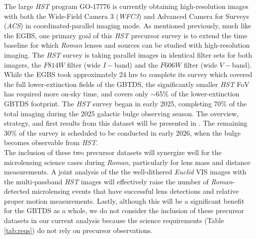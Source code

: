 \documentclass[twocolumn]{aastex631}
\begin{document}
\indent The large \textit{HST} program GO-17776 \citep{terry:2025b} is currently obtaining high-resolution images with both the Wide-Field Camera 3 (\textit{WFC3}) and Advanced Camera for Surveys (\textit{ACS}) in coordinated-parallel imaging mode. As mentioned previously, much like the EGBS, one primary goal of this \textit{HST} precursor survey is to extend the time baseline for which \textit{Roman} lenses and sources can be studied with high-resolution imaging. The \textit{HST} survey is taking parallel images in identical filter sets for both imagers, the $F814W$ filter (wide $I-$band) and the $F606W$ filter (wide $V-$band). While the EGBS took approximately 24 hrs to complete its survey which covered the full lower-extinction fields of the GBTDS, the significantly smaller \textit{HST} FoV has required more on-sky time, and covers only ${\sim}$65\% of the lower-extinction GBTDS footprint. The \textit{HST} survey began in early 2025, completing 70\% of the total imaging during the 2025 galactic bulge observing season. The overview, strategy, and first results from this dataset will be presented in \cite{terry:inprep}. The remaining 30\% of the survey is scheduled to be conducted in early 2026, when the bulge becomes observable from \textit{HST}. \\
\indent The inclusion of these two precursor datasets will synergize well for the microlensing science cases during \textit{Roman}, particularly for lens mass and distance measurements. A joint analysis of the the well-dithered \textit{Euclid} VIS images with the multi-passband \textit{HST} images will effectively raise the number of \textit{Roman}-detected microlensing events that have successful lens detections and relative proper motion measurements. Lastly, although this will be a significant benefit for the GBTDS as a whole, we do not consider the inclusion of these precursor datasets in our current analysis because the science requirements (Table \ref{tab:reqs}) do not rely on precursor observations.
\end{document}

